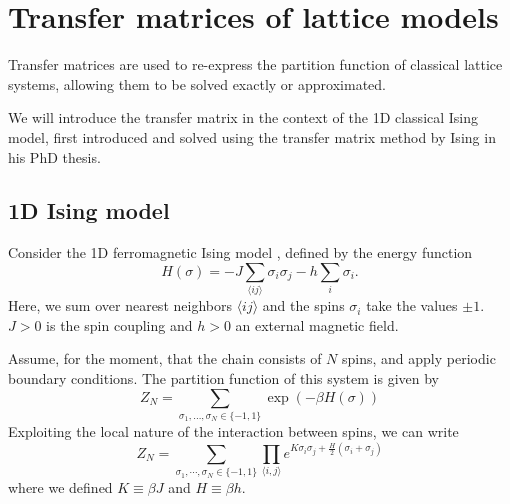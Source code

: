 \section{Transfer matrices of lattice models}

Transfer matrices are used to re-express the partition function of classical
lattice systems, allowing them to be solved exactly or approximated.

We will introduce the transfer matrix in the context of the 1D classical
Ising model, first introduced and solved using the transfer matrix method by Ising
\cite{ising1925beitrag} in his PhD thesis.

\subsection{1D Ising model}


Consider the 1D ferromagnetic Ising model \cite{ising1925beitrag}, defined by the energy function
\begin{equation}\label{ising_energy_function}
  H(\sigma) = -J \sum_{\langle i j \rangle} \sigma_i \sigma_j - h \sum_{i} \sigma_i.
\end{equation}
Here, we sum over nearest neighbors $\langle i j \rangle$ and the spins
$\sigma_i$ take the values $\pm 1$. $J > 0$ is the spin coupling and $h > 0$ an external magnetic field.

Assume, for the moment, that the chain
consists of $N$ spins, and apply periodic boundary conditions.
The partition function of this system is given by
\begin{equation}
  Z_{N} = \sum_{\sigma_1, \dotsc, \sigma_N \in \{-1, 1\}} \exp (-\beta H(\sigma))
\end{equation}
Exploiting the local nature of the interaction between spins, we can write
\begin{equation}
  Z_{N} = \sum_{\sigma_1, \cdots, \sigma_N \in \{-1, 1\}} \prod_{\langle i, j \rangle} e^{K\sigma_i \sigma_j + \frac{H}{2}(\sigma_i + \sigma_j)}
\end{equation}
where we defined $K \equiv \beta J$ and $H \equiv \beta h$.

